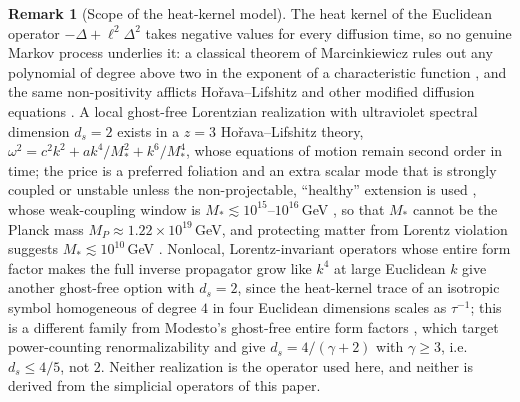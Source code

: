 \documentclass[11pt,a4paper,reqno]{amsart}
\theoremstyle{definition}
\newtheorem{remark}[theorem]{Remark}
\numberwithin{equation}{section}
\begin{document}
\begin{remark}[Scope of the heat-kernel model]
The heat kernel of the Euclidean operator $-\Delta + \ell^2 \Delta^2$ takes negative values for every diffusion time, so no genuine Markov process underlies it: a classical theorem of Marcinkiewicz rules out any polynomial of degree above two in the exponent of a characteristic function \cite{marcinkiewicz1939}, and the same non-positivity afflicts Ho\v{r}ava--Lifshitz and other modified diffusion equations \cite{calcagni2013probing}. A local ghost-free Lorentzian realization with ultraviolet spectral dimension $d_s = 2$ exists in a $z = 3$ Ho\v{r}ava--Lifshitz theory, $\omega^2 = c^2k^2 + ak^4/M_\ast^2 + k^6/M_\ast^4$, whose equations of motion remain second order in time; the price is a preferred foliation and an extra scalar mode that is strongly coupled or unstable unless the non-projectable, ``healthy'' extension is used \cite{blas2009extra}, whose weak-coupling window is $M_\ast \lesssim 10^{15}$--$10^{16}$\,GeV \cite{blas2011models}, so that $M_\ast$ cannot be the Planck mass $M_P \approx 1.22\times10^{19}$\,GeV, and protecting matter from Lorentz violation suggests $M_\ast \lesssim 10^{10}$\,GeV \cite{pospelov2012lorentz}. Nonlocal, Lorentz-invariant operators whose entire form factor makes the full inverse propagator grow like $k^4$ at large Euclidean $k$ give another ghost-free option with $d_s = 2$, since the heat-kernel trace of an isotropic symbol homogeneous of degree $4$ in four Euclidean dimensions scales as $\tau^{-1}$; this is a different family from Modesto's ghost-free entire form factors \cite{modesto2012}, which target power-counting renormalizability and give $d_s = 4/(\gamma+2)$ with $\gamma \ge 3$, i.e.\ $d_s \le 4/5$, not $2$. Neither realization is the operator used here, and neither is derived from the simplicial operators of this paper.
\end{remark}
\end{document}
